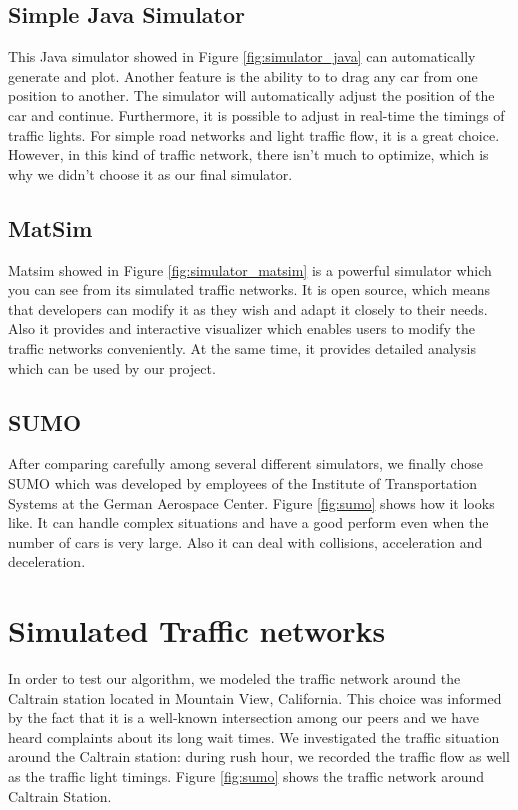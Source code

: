 \documentclass{article} %
\begin{document}
\subsection{Simple Java Simulator}
This Java simulator showed in Figure \ref{fig:simulator_java} can automatically generate and plot. Another feature is the ability to to drag any car from one position to another. The simulator will automatically adjust the position of the car and continue. Furthermore, it is possible to adjust in real-time the timings of traffic lights. For simple road networks and light traffic flow, it is a great choice. However, in this kind of traffic network, there isn't much to optimize, which is why we didn't choose it as our final simulator. 
\subsection{MatSim}
Matsim showed in Figure \ref{fig:simulator_matsim} is a powerful simulator which you can see from its simulated traffic networks. It is open source, which means that developers can modify it as they wish and adapt it closely to their needs. Also it provides and interactive visualizer which enables users to modify the traffic networks conveniently. At the same time, it provides detailed analysis which can be used by our project.
\subsection{SUMO}
After comparing carefully among several different simulators, we finally chose SUMO which was developed by employees of the Institute of Transportation Systems at the German Aerospace Center. Figure \ref{fig:sumo} shows how it looks like. It can handle complex situations and have a good perform even when the number of cars is very large. Also it can deal with collisions, acceleration and deceleration.

\section{Simulated Traffic networks}
In order to test our algorithm, we modeled the traffic network around the Caltrain station located in Mountain View, California. This choice was informed by the fact that it is a well-known intersection among our peers and we have heard complaints about its long wait times. We investigated the traffic situation around the Caltrain station: during rush hour, we recorded the traffic flow as well as the traffic light timings. Figure \ref{fig:sumo} shows the traffic network around Caltrain Station.
\end{document}
